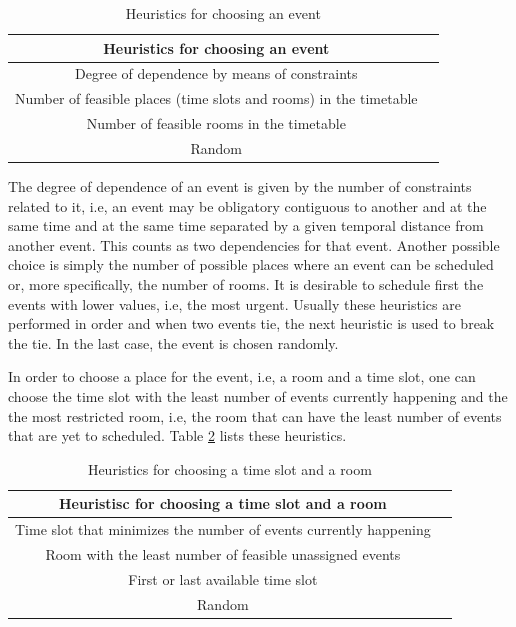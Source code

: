 \begin{table}[H]
\centering
\begin{tabular}{|c|c|}
\hline
	\textbf{Heuristics for choosing an event}\\
\hline
	Degree of dependence by means of constraints\\
\hline
	Number of feasible places (time slots and rooms) in the timetable\\
\hline
	Number of feasible rooms in the timetable\\
\hline 
	Random \\
\hline
\end{tabular}
\caption[Heuristics for choosing an event]{Heuristics for choosing an event}
\label{tab:h_placing_events}
\end{table}

The degree of dependence of an event is given by the number of constraints related to it, i.e, an event may be obligatory contiguous to another and at the same time and at the same time separated by a given temporal distance from another event. This counts as two dependencies for that event. Another possible choice is simply the number of possible places where an event can be scheduled or, more specifically, the number of rooms. It is desirable to schedule first the events with lower values, i.e, the most urgent. Usually these heuristics are performed in order and when two events tie, the next heuristic is used to break the tie. In the last case, the event is chosen randomly.

In order to choose a place for the event, i.e, a room and a time slot, one can choose the time slot with the least number of events currently happening and the the most restricted room, i.e, the room that can have the least number of events that are yet to scheduled. Table \ref{tab:h_placing_timeslots} lists these heuristics.
\begin{table}[H]
\centering
\begin{tabular}{|c|c|}
\hline
	\textbf{Heuristisc for choosing a time slot and a room}\\
\hline
	Time slot that minimizes the number of events currently happening\\
\hline
	Room with the least number of feasible unassigned events\\
\hline
	First or last available time slot\\
\hline
	Random \\
\hline
\end{tabular}
\caption[Heuristics for choosing a time slot and room]{Heuristics for choosing a time slot and a room}
\label{tab:h_placing_timeslots}
\end{table}

